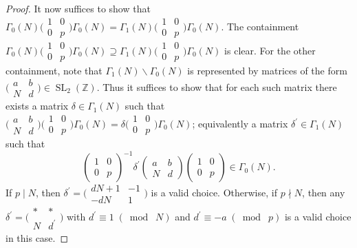 \documentclass[10pt,leqno,twoside]{article}
\theoremstyle{plain}
\theoremstyle{definition}
\numberwithin{equation}{section}
\numberwithin{lem}{section}
\DeclareMathOperator{\SL}{SL}
\newcommand{\smod}[1]{\;(\bmod\; #1)}
\newcommand{\slz}{\SL_2(\mathbb{Z})}
\begin{document}
\begin{proof}
    It now suffices to show that $\varGamma_0(N)\big(\!\begin{smallmatrix}
        1 & 0 \\ 0 & p
    \end{smallmatrix}\!\big)\varGamma_0(N) = \varGamma_1(N)\big(\!\begin{smallmatrix}
        1 & 0 \\ 0 & p
    \end{smallmatrix}\!\big)\varGamma_0(N)$.
    The containment $\varGamma_0(N)\big(\!\begin{smallmatrix}
        1 & 0 \\ 0 & p
    \end{smallmatrix}\!\big)\varGamma_0(N) \supseteq \varGamma_1(N)\big(\!\begin{smallmatrix}
        1 & 0 \\ 0 & p
    \end{smallmatrix}\!\big)\varGamma_0(N)$ is clear. For the other containment, note that $\varGamma_1(N)\backslash \varGamma_0(N)$ is represented by matrices of the form $\big(\!\begin{smallmatrix}
        a & b \\ N & d
    \end{smallmatrix}\!\big)\in\slz$. Thus it suffices to show that for each such matrix there exists a matrix $\delta\in\varGamma_1(N)$ such that $\big(\!\begin{smallmatrix}
        a & b \\ N & d
    \end{smallmatrix}\!\big)\big(\!\begin{smallmatrix}
        1 & 0 \\ 0 & p
    \end{smallmatrix}\!\big)\varGamma_0(N) = \delta \big(\!\begin{smallmatrix}
        1 & 0 \\ 0 & p
    \end{smallmatrix}\!\big)\varGamma_0(N)$; equivalently a matrix $\delta^\prime\in\varGamma_1(N)$ such that \[\begin{pmatrix}
        1 & 0 \\ 0 & p
    \end{pmatrix}^{-1}\delta^\prime\begin{pmatrix}
        a & b \\ N & d
    \end{pmatrix}\begin{pmatrix}
        1 & 0 \\ 0 & p
    \end{pmatrix}\in \varGamma_0(N).\]
    If $p\mid N$, then $\delta^\prime = \big(\!\begin{smallmatrix}
        dN+1 & -1 \\ -dN & 1
    \end{smallmatrix}\!\big)$ is a valid choice. Otherwise, if $p\nmid N$, then any $\delta^\prime = \big(\!\begin{smallmatrix}
        \ast & \ast \\ N & d^\prime
    \end{smallmatrix}\!\big)$ with $d^\prime\equiv 1\smod N$ and $d^\prime\equiv -a\smod p$ is a valid choice in this case.
\end{proof}
\end{document}
